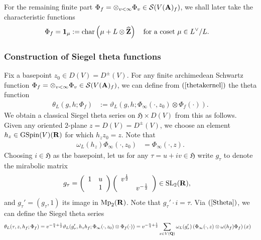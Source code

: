 \documentclass{amsart}
\theoremstyle{definition}
\theoremstyle{definition}
\theoremstyle{definition}
\begin{document}
For the remaining finite part $\Phi_f = \otimes_{v < \infty} \Phi_v \in \mathcal{S}(V({\bf{A}})_f)$, we shall later take the characteristic functions 
\begin{align*} \Phi_f &= {\bf{1}}_{\mu} := \operatorname{char} \left( \mu + L \otimes \widehat{{\bf{Z}}} \right)
\quad \text{for a coset $\mu \in L^{\vee}/L$}. \end{align*}

\subsubsection{Construction of Siegel theta functions} 

Fix a basepoint $z_0 \in D(V) = D^{\pm}(V)$. For any finite archimedean Schwartz function 
$\Phi_f = \otimes_{v < \infty} \Phi_v \in \mathcal{S}(V({\bf{A}})_f)$, we can define from $(\ref{thetakernel})$ the theta function
\begin{align}\label{Stheta} \theta_L(g, h; \Phi_f) &:= \vartheta_L(g, h; \Phi_{\infty}(\cdot, z_0) \otimes \Phi_f(\cdot)). \end{align}
We obtain a classical Siegel theta series on $\mathfrak{H} \times D(V)$ from this as follows. Given any oriented $2$-plane 
$z = D(V)  = D^{\pm}(V)$, we choose an element $h_z \in \operatorname{GSpin}(V)({\bf{R}})$ for which $h_z z_0 = z$. Note that 
\begin{align*} \omega_L(h_z) \Phi_{\infty}(\cdot, z_0) &= \Phi_{\infty}(\cdot, z). \end{align*}
Choosing $i \in \mathfrak{H}$ as the basepoint, let us for any $\tau = u + iv \in \mathfrak{H}$ write $g_{\tau}$ to denote the mirabolic matrix 
\begin{align*} g_{\tau}  &= \left( \begin{array}{cc} 1 & u \\ ~& 1 \end{array} \right) 
\left( \begin{array}{cc} v^{\frac{1}{2}} & ~\\ ~& v^{-\frac{1}{2}} \end{array} \right) \in \operatorname{SL}_2({\bf{R}}), \end{align*}
and $g_{\tau}' = (g_{\tau}, 1)$ its image in $\operatorname{Mp}_2({\bf{R}})$. 
Note that $g_{\tau}' \cdot i = \tau$. Via $(\ref{Stheta})$, we can define the Siegel theta series 
\begin{equation*}\begin{aligned} \theta_L(\tau, z, h_f; \Phi_f) 
&= v^{-\frac{n}{4} + \frac{1}{2}}  \vartheta_L (g_{\tau}', h_z h_f; \Phi_{\infty}(\cdot, z_0) \otimes \Phi_f(\cdot)) 
= v^{-\frac{n}{4} + \frac{1}{2}} \sum\limits_{x \in V({\bf{Q}})} 
\omega_L(g_{\tau}') \left( \Phi_{\infty}(\cdot, z) \otimes \omega(h_f) \Phi_f \right)(x) \end{aligned}\end{equation*}
\end{document}
